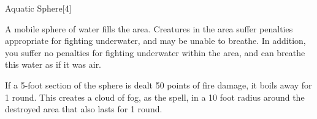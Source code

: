 \begin{spellsection}{Aquatic Sphere}[4]
    \begin{spellheader}
    \end{spellheader}
    \begin{spellcontent}
        \begin{spelltargetinginfo}
        \end{spelltargetinginfo}
        \begin{spelleffects}
            \spelleffect A mobile sphere of water fills the area.
            Creatures in the area suffer penalties appropriate for fighting underwater, and may be unable to breathe.
            In addition, you suffer no penalties for fighting underwater within the area, and can breathe this water as if it was air.
            \spelldur \durshort
        \end{spelleffects}
    \end{spellcontent}
    \begin{spellfooter}
        \spellnotes If a 5-foot section of the sphere is dealt 50 points of fire damage, it boils away for 1 round.
        This creates a cloud of fog, as the  spell, in a 10 foot radius around the destroyed area that also lasts for 1 round.
        \miscastexplode
    \end{spellfooter}
    \begin{spellaugments}
    \end{spellaugments}
\end{spellsection}


